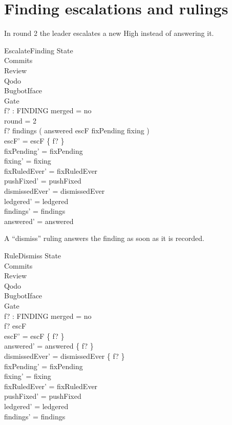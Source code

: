 \documentclass{article}
\begin{document}
\section{Finding escalations and rulings}

In round 2 the leader escalates a new High instead of answering it.

\begin{schema}{EscalateFinding}
  \Delta State \\
  \Xi Commits \\
  \Xi Review \\
  \Xi Qodo \\
  \Xi BugbotIface \\
  \Xi Gate \\
  f? : FINDING
\where
  merged = no \\
  round = 2 \\
  f? \in findings \setminus ( answered \cup escF \cup fixPending \cup fixing ) \\
  escF' = escF \cup \{ f? \} \\
  fixPending' = fixPending \\
  fixing' = fixing \\
  fixRuledEver' = fixRuledEver \\
  pushFixed' = pushFixed \\
  dismissedEver' = dismissedEver \\
  ledgered' = ledgered \\
  findings' = findings \\
  answered' = answered
\end{schema}

A ``dismiss'' ruling answers the finding as soon as it is recorded.

\begin{schema}{RuleDismiss}
  \Delta State \\
  \Xi Commits \\
  \Xi Review \\
  \Xi Qodo \\
  \Xi BugbotIface \\
  \Xi Gate \\
  f? : FINDING
\where
  merged = no \\
  f? \in escF \\
  escF' = escF \setminus \{ f? \} \\
  answered' = answered \cup \{ f? \} \\
  dismissedEver' = dismissedEver \cup \{ f? \} \\
  fixPending' = fixPending \\
  fixing' = fixing \\
  fixRuledEver' = fixRuledEver \\
  pushFixed' = pushFixed \\
  ledgered' = ledgered \\
  findings' = findings
\end{schema}
\end{document}
